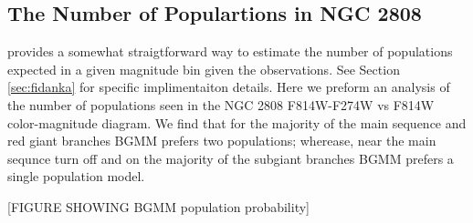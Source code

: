 \subsection{The Number of Populartions in NGC 2808}
\fidanka provides a somewhat straigtforward way to estimate the number of populations expected in a given magnitude bin given the observations. See Section \ref{sec:fidanka} for specific implimentaiton details. Here we preform an analysis of the number of populations seen in the NGC 2808 F814W-F274W vs F814W color-magnitude diagram. We find that for the majority of the main sequence and red giant branches BGMM prefers two populations; wherease, near the main sequnce turn off and on the majority of the subgiant branches BGMM prefers a single population model.

{\color{red}[FIGURE SHOWING BGMM population probability]}

